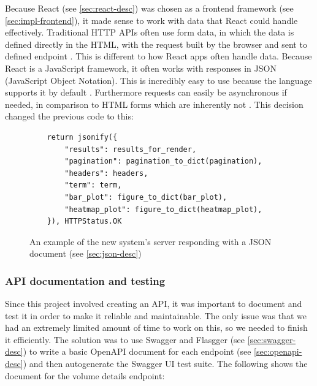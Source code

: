 \documentclass[12pt, letterpaper]{article}
\begin{document}
\begin{flushleft}
Because React (see \ref{sec:react-desc}) was chosen as a frontend framework (see \ref{sec:impl-frontend}), it made sense to work with data that React could handle effectively. Traditional HTTP APIs often use form data, in which the data is defined directly in the HTML, with the request built by the browser and sent to defined endpoint \cite{html-forms}. This is different to how React apps often handle data. Because React is a JavaScript framework, it often works with responses in JSON (JavaScript Object Notation). This is incredibly easy to use because the language supports it by default \cite{react-json}. Furthermore requests can easily be asynchronous if needed, in comparison to HTML forms which are inherently not \cite{html-forms}. This decision changed the previous code to this:
\end{flushleft}

\begin{flushleft}
\begin{figure}[H]
\begin{verbatim}
    return jsonify({
        "results": results_for_render,
        "pagination": pagination_to_dict(pagination),
        "headers": headers,
        "term": term,
        "bar_plot": figure_to_dict(bar_plot),
        "heatmap_plot": figure_to_dict(heatmap_plot),
    }), HTTPStatus.OK
\end{verbatim}
\caption{An example of the new system's server responding with a JSON document (see \ref{sec:json-desc})}
\end{figure}
\end{flushleft}

\subsubsection{API documentation and testing}\label{sec:impl-api-doc-test}

\begin{flushleft}
Since this project involved creating an API, it was important to document and test it in order to make it reliable and maintainable. The only issue was that we had an extremely limited amount of time to work on this, so we needed to finish it efficiently. The solution was to use Swagger and Flasgger (see \ref{sec:swagger-desc}) to write a basic OpenAPI document for each endpoint (see \ref{sec:openapi-desc}) and then autogenerate the Swagger UI test suite. The following shows the document for the volume details endpoint:
\end{flushleft}
\end{document}
